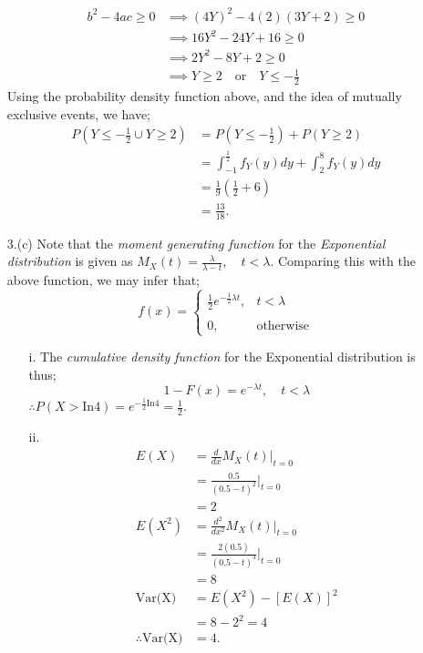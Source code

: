 \documentclass[12pt,a4paper, fleq]{article}
\begin{document}
\begin{itemize}
\begin{equation*}
\begin{split}
b^2 - 4ac \ge 0 & \implies (4Y)^2 - 4(2)(3Y+2) \ge 0\\
& \implies 16Y^2-24Y + 16 \ge 0\\
& \implies 2Y^2 -8Y + 2 \ge 0\\
&\implies Y \ge 2\quad \mbox{or}\quad Y \le -\frac12
\end{split}
\end{equation*}
Using the probability density function above, and the idea of mutually exclusive events, we have;
\begin{equation*}
\begin{split}
P(Y \le -\frac12 \cup Y \ge 2)  & = P(Y \le -\frac12) + P(Y \ge 2)\\[2mm]
& = \int_{-1}^{\frac12}f_Y(y)dy + \int_2^8 f_Y(y)dy\\[2mm]
& = \frac19(\frac12 + 6)\\[2mm]
& = \frac{13}{18}.
\end{split}
\end{equation*}

\item[3.(c)]
Note that the {\it moment generating function} for the {\it Exponential distribution} is given as $M_X(t) = \frac{\lambda}{\lambda - t}, \quad t < \lambda$. Comparing this with the above function, we may infer that;
\begin{equation*}
f(x) = 
\begin{cases}
\frac12 e^{-\frac12\lambda t}, & t < \lambda \\
\\
0, & \mbox{otherwise}
\end{cases}
\end{equation*}

\begin{itemize}
\item[i.]
The {\it cumulative density function} for the Exponential distribution is thus;
$$1 - F(x) = e^{-\lambda t},\quad t < \lambda$$
$\therefore P(X > \mbox{In4}) = e^{-\frac12\mbox{In4}} = \frac12.$

\item[ii.]
\begin{equation*}
\begin{split}
E(X) & = \frac{d}{dx}M_X(t)\bigg\lvert_{t = 0}\\
& = \frac{0.5}{(0.5 - t)^2}\bigg\lvert_{t=0}\\
& = 2\\[4mm]
E(X^2) & = \frac{d^2}{dx^2}M_X(t)\bigg\lvert_{t = 0}\\
& = \frac{2(0.5)}{(0.5 - t)^3}\bigg\lvert_{t= 0}\\
& = 8\\[4mm]
\mbox{Var(X)} & = E(X^2) - [E(X)]^2\\
& = 8 - 2^2 = 4\\
\therefore \mbox{Var(X)} & = 4.
\end{split}
\end{equation*}

\end{itemize}
\end{itemize}
\end{document}
